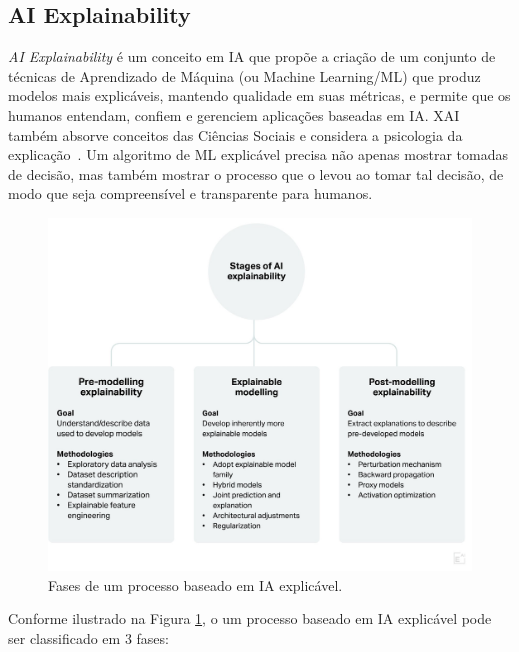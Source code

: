\documentclass[portugues, 12pt, a4paper]{article}
\begin{document}
\subsection{AI Explainability}

\textit{AI Explainability} é um conceito em IA que propõe a criação de um conjunto de técnicas de Aprendizado de Máquina (ou Machine Learning/ML) que produz modelos mais explicáveis, mantendo qualidade em suas métricas, e permite que os humanos entendam, confiem e gerenciem aplicações baseadas em IA. XAI também absorve conceitos das Ciências Sociais e considera a psicologia da explicação~\citep{Arrieta_2020}. Um algoritmo de ML explicável precisa não apenas mostrar tomadas de decisão, mas também mostrar o processo que o levou ao tomar tal decisão, de modo que seja compreensível e transparente para humanos.

\begin{figure}[h]
\centering
\includegraphics[scale=0.2]{images/phases.jpeg}
\caption {Fases de um processo baseado em IA explicável.}
\label{fig:StagesExplainableAI}
\end{figure}

Conforme ilustrado na Figura \ref{fig:StagesExplainableAI}, o um processo baseado em IA explicável pode ser classificado em 3 fases:
\end{document}
